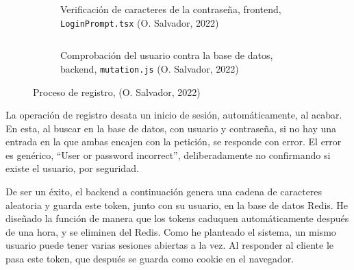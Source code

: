 \documentclass[11pt]{article}
\begin{document}
\begin{flushleft}
		\begin{figure}[htb]
			\centering
			\begin{subfigure}{.9\textwidth}
				\hspace{-3cm}
				\inputminted[fontsize=\scriptsize, firstline=74, lastline=74, linenos, frame=single, tabsize=1]{javascript}{../../frontend/src/components/LoginPrompt.tsx}
				\caption{Verificación de caracteres de la contraseña, frontend, \texttt{LoginPrompt.tsx} (O. Salvador, 2022)}
			\end{subfigure}
			\linebreak
			
			
			
			\begin{subfigure}{.9\textwidth}
				\hspace{-3cm}
				\inputminted[fontsize=\scriptsize, firstline=153, lastline=160, linenos, frame=single]{javascript}{../../backend/src/resolvers/mutation.js}
				\caption{Comprobación del usuario contra la base de datos, backend, \texttt{mutation.js} (O. Salvador, 2022)}
			\end{subfigure}
			

			\caption{Proceso de registro, (O. Salvador, 2022)}
		\end{figure}
		
	La operación de registro desata un inicio de sesión, automáticamente, al acabar. En esta, al buscar en la base de datos, con usuario y contraseña, si no hay una entrada en la que ambas encajen con la petición, se responde con error. El error es genérico, ``User or password incorrect'', deliberadamente no confirmando si existe el usuario, por seguridad. 
	\linebreak
	
	De ser un éxito, el backend a continuación genera una cadena de caracteres aleatoria y guarda este token, junto con su usuario, en la base de datos Redis. He diseñado la función de manera que los tokens caduquen automáticamente después de una hora, y se eliminen del Redis. Como he planteado el sistema, un mismo usuario puede tener varias sesiones abiertas a la vez. Al responder al cliente le pasa este token, que después se guarda como cookie en el navegador.
	\linebreak
	

\end{flushleft}
\end{document}
